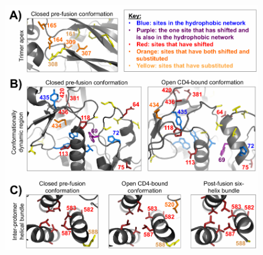 \documentclass[9pt]{elife}
\begin{document}
\begin{figure}
{}
{\includegraphics[width=\textwidth]{figures/shifts_on_structure/clusters_on_structure.pdf}}
\end{figure}
\end{document}

